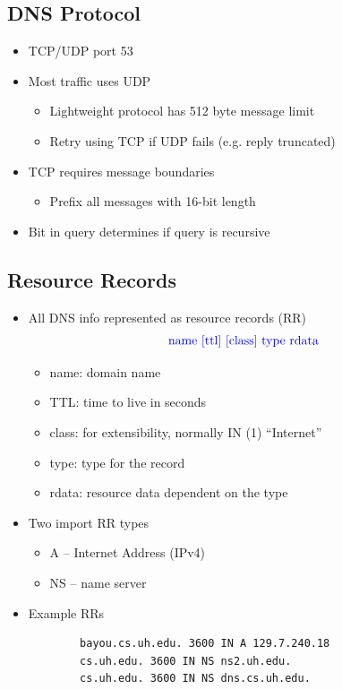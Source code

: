 \subsection{DNS Protocol}
\begin{itemize}[nosep]
    \item TCP/UDP port 53
    \item Most traffic uses UDP
          \begin{itemize}[nosep]
              \item Lightweight protocol has 512 byte message limit
              \item Retry using TCP if UDP fails (e.g. reply truncated)
          \end{itemize}
    \item TCP requires message boundaries
          \begin{itemize}[nosep]
              \item Prefix all messages with 16-bit length
          \end{itemize}
    \item Bit in query determines if query is recursive
\end{itemize}
\subsection{Resource Records}
\begin{itemize}[nosep]
    \item All DNS info represented as resource records (RR) \[\text{\textcolor{blue}{name [ttl] [class] type rdata}}\]
          \begin{itemize}[nosep]
              \item name: domain name
              \item TTL: time to live in seconds
              \item class: for extensibility, normally IN (1) ``Internet''
              \item type: type for the record
              \item rdata: resource data dependent on the type
          \end{itemize}
    \item Two import RR types
          \begin{itemize}[nosep]
              \item A -- Internet Address (IPv4)
              \item NS -- name server
          \end{itemize}
    \item Example RRs
          \begin{verbatim}
        bayou.cs.uh.edu. 3600 IN A 129.7.240.18
        cs.uh.edu. 3600 IN NS ns2.uh.edu.
        cs.uh.edu. 3600 IN NS dns.cs.uh.edu.
    \end{verbatim}
\end{itemize}
